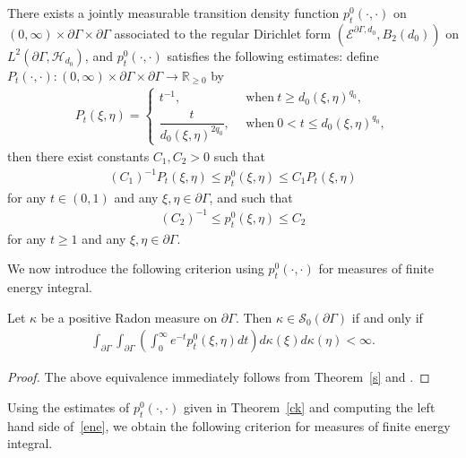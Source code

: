 \documentclass[AHL,Unicode,longabstracts,published]{cedram}
\newcommand{\ce}{\mathcal{E}}
\newcommand{\cs}{\mathcal{S}}
\newcommand{\ch}{\mathcal{H}}
\newcommand{\br}{\mathbb{R}}
\begin{document}
\begin{theo}\label{ck}
There exists a jointly measurable transition density function $p_t^0(\cdot,\cdot)$ on $(0,\infty)\times\partial\Gamma\times\partial\Gamma$ associated to the regular Dirichlet form $(\ce^{\partial\Gamma,d_0},B_2(d_0))$ on $L^2(\partial\Gamma,\ch_{d_0})$, and $p_t^0(\cdot,\cdot)$ satisfies the following estimates: define $P_t(\cdot,\cdot):(0,\infty)\times\partial\Gamma\times\partial\Gamma\to\br_{\geq0}$ by
\begin{align*}
P_t(\xi,\eta)=
\begin{cases}
t^{-1},\ \ &\text{when}\ t\geq d_0(\xi,\eta)^{q_0},\\
\dfrac{t}{d_0(\xi,\eta)^{2q_0}},\ \ &\text{when}\ 0<t\leq d_0(\xi,\eta)^{q_0},
\end{cases}
\end{align*}
then there exist constants $C_1,C_2>0$ such that
\begin{align*}
(C_1)^{-1}P_t(\xi,\eta)\leq p_t^0(\xi,\eta)\leq C_1P_t(\xi,\eta)
\end{align*}
for any $t\in(0,1)$ and any $\xi,\eta\in\partial\Gamma$, and such that
\begin{align*}
(C_2)^{-1}\leq p_t^0(\xi,\eta)\leq C_2
\end{align*}
for any $t\geq1$ and any $\xi,\eta\in\partial\Gamma$.
\end{theo}

We now introduce the following criterion using $p_t^0(\cdot,\cdot)$ for measures of finite energy integral.

\begin{lemm}\label{rho2}
Let $\kappa$ be a positive Radon measure on $\partial\Gamma$. Then $\kappa\in\cs_0(\partial\Gamma)$ if and only if
\begin{align}\label{ene}
\int_{\partial\Gamma}\int_{\partial\Gamma}\left(\int_0^{\infty}e^{-t}p_t^0(\xi,\eta)dt\right)d\kappa(\xi) d\kappa(\eta)<\infty.
\end{align}
\end{lemm}

\begin{proof}
The above equivalence immediately follows from Theorem~\ref{s} and \cite[Problem~4.2.1]{FOT}.
\end{proof}


Using the estimates of $p_t^0(\cdot,\cdot)$ given in Theorem~\ref{ck} and computing the left hand side of~\eqref{ene}, we obtain the following criterion for measures of finite energy integral.
\end{document}
